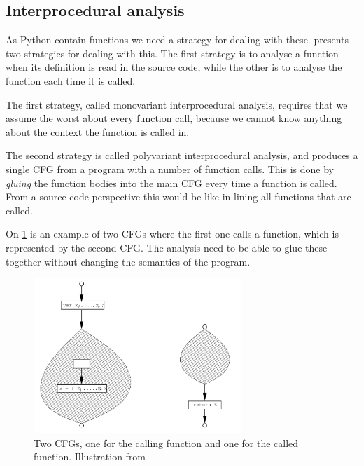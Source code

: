 \subsection{Interprocedural analysis}
As Python contain functions we need a strategy for dealing with these.
\citet{schwartzbach} presents two strategies for dealing with this.
The first strategy is to analyse a function when its definition is read in the source code, while the other is to analyse the function each time it is called.

The first strategy, called monovariant interprocedural analysis, requires that we assume the worst about every function call, because we cannot know anything about the context the function is called in.

The second strategy is called polyvariant interprocedural analysis, and produces a single CFG from a program with a number of function calls.
This is done by \emph{gluing} the function bodies into the main CFG every time a function is called.
From a source code perspective this would be like in-lining all functions that are called.


On \cref{interprocedural_cfgs} is an example of two CFGs where the first one calls a function, which is represented by the second CFG.
The analysis need to be able to glue these together without changing the semantics of the program.

\begin{figure}[H]
  \center
  \includegraphics[width=0.7\textwidth]{figures/interprocedural_cfgs}
  \caption{Two CFGs, one for the calling function and one for the called function. Illustration from \citet[p.~37]{schwartzbach}}
  \label{interprocedural_cfgs}
\end{figure}


